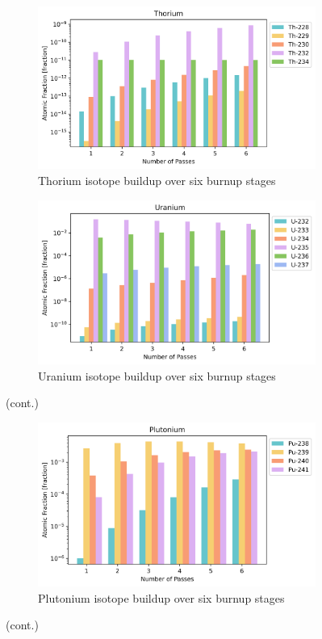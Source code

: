 \begin{figure}[H]\ContinuedFloat
\centering


\begin{subfigure}{0.95\textwidth}
  \includegraphics[width=\linewidth]{figures/compositions/thorium}
  \caption{Thorium isotope buildup over six burnup stages}
  \label{fig:th}
\end{subfigure}%

\begin{subfigure}{0.95\textwidth}
  \includegraphics[width=\linewidth]{figures/compositions/uranium}
  \caption{Uranium isotope buildup over six burnup stages}
  \label{fig:u}
\end{subfigure}%

\caption[]{(cont.)}
\end{figure}

\begin{figure}[H]\ContinuedFloat
\centering

\begin{subfigure}{0.95\textwidth}
  \includegraphics[width=\linewidth]{figures/compositions/plutonium}
  \caption{Plutonium isotope buildup over six burnup stages}
  \label{fig:pu}
\end{subfigure}%

\caption[]{(cont.)}
\label{fig:comps}
\end{figure}